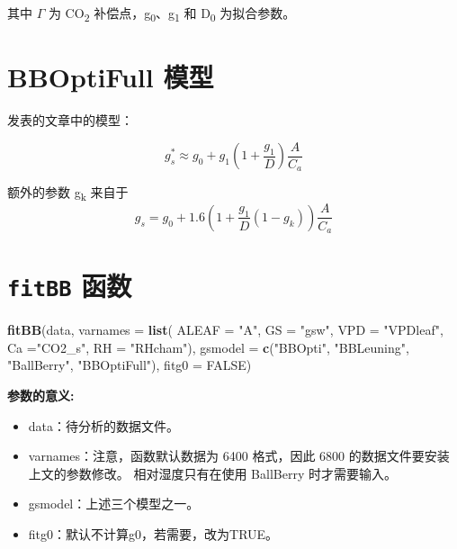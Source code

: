 \documentclass[
]{krantz}
\makeatletter
\newenvironment{Shaded}{\begin{snugshade}}{\end{snugshade}}
\newcommand{\DataTypeTok}[1]{\textcolor[rgb]{0.13,0.29,0.53}{#1}}
\newcommand{\KeywordTok}[1]{\textcolor[rgb]{0.13,0.29,0.53}{\textbf{#1}}}
\newcommand{\NormalTok}[1]{#1}
\newcommand{\OtherTok}[1]{\textcolor[rgb]{0.56,0.35,0.01}{#1}}
\newcommand{\StringTok}[1]{\textcolor[rgb]{0.31,0.60,0.02}{#1}}
\providecommand{\tightlist}{%
  \setlength{\itemsep}{0pt}\setlength{\parskip}{0pt}}
\newenvironment{kframe}{%
\medskip{}
\setlength{\fboxsep}{.8em}
 \def\at@end@of@kframe{}%
 \ifinner\ifhmode%
  \def\at@end@of@kframe{\end{minipage}}%
  \begin{minipage}{\columnwidth}%
 \fi\fi%
 \def\FrameCommand##1{\hskip\@totalleftmargin \hskip-\fboxsep
 \colorbox{shadecolor}{##1}\hskip-\fboxsep
     \hskip-\linewidth \hskip-\@totalleftmargin \hskip\columnwidth}%
 \MakeFramed {\advance\hsize-\width
   \@totalleftmargin\z@ \linewidth\hsize
   \@setminipage}}%
 {\par\unskip\endMakeFramed%
 \at@end@of@kframe}
\renewenvironment{Shaded}{\begin{kframe}}{\end{kframe}}
\makeatother
\begin{document}
其中 \(\Gamma\) 为 CO\textsubscript{2} 补偿点，g\textsubscript{0}、g\textsubscript{1} 和 D\textsubscript{0} 为拟合参数。

\hypertarget{bboptifull}{%
\section{BBOptiFull 模型}\label{bboptifull}}

\citet{Medlyn2011Reconciling} 发表的文章中的模型：

\begin{equation}
g_s^* \approx g_0 + g_1(1 + \frac{g_1}{D}) \frac{A}{C_a}
\label{eq:BBOptiFull}
\end{equation}

额外的参数 g\textsubscript{k} 来自于 \citet{Duursma2013Near}
\begin{equation}
g_s = g_0 + 1.6(1 + \frac{g_1}{D}(1-g_k)) \frac{A}{C_a}
\label{eq:Duursm}
\end{equation}

\hypertarget{fitbb-p}{%
\section{\texorpdfstring{\texttt{fitBB} 函数}{fitBB 函数}}\label{fitbb-p}}

\begin{Shaded}
\begin{Highlighting}[]
\KeywordTok{fitBB}\NormalTok{(data, }\DataTypeTok{varnames =} \KeywordTok{list}\NormalTok{(}
  \DataTypeTok{ALEAF =} \StringTok{"A"}\NormalTok{, }\DataTypeTok{GS =} \StringTok{"gsw"}\NormalTok{, }\DataTypeTok{VPD =} \StringTok{"VPDleaf"}\NormalTok{,}
  \DataTypeTok{Ca =}\StringTok{"CO2\_s"}\NormalTok{, }\DataTypeTok{RH =} \StringTok{"RHcham"}\NormalTok{), }
  \DataTypeTok{gsmodel =} \KeywordTok{c}\NormalTok{(}\StringTok{"BBOpti"}\NormalTok{, }\StringTok{"BBLeuning"}\NormalTok{, }\StringTok{"BallBerry"}\NormalTok{,}
              \StringTok{"BBOptiFull"}\NormalTok{), }\DataTypeTok{fitg0 =} \OtherTok{FALSE}\NormalTok{)}
\end{Highlighting}
\end{Shaded}

\textbf{参数的意义:}

\begin{itemize}
\tightlist
\item
  data：待分析的数据文件。
\item
  varnames：注意，函数默认数据为 6400 格式，因此 6800 的数据文件要安装上文的参数修改。 相对湿度只有在使用 BallBerry 时才需要输入。
\item
  gsmodel：上述三个模型之一。
\item
  fitg0：默认不计算g0，若需要，改为TRUE。
\end{itemize}
\end{document}
